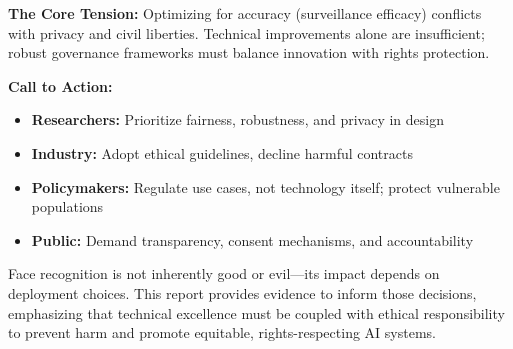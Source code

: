 \documentclass[11pt,a4paper]{article}
\begin{document}
\textbf{The Core Tension:} Optimizing for accuracy (surveillance efficacy) conflicts with privacy and civil liberties. Technical improvements alone are insufficient; robust governance frameworks must balance innovation with rights protection.

\textbf{Call to Action:}
\begin{itemize}
    \item \textbf{Researchers:} Prioritize fairness, robustness, and privacy in design
    \item \textbf{Industry:} Adopt ethical guidelines, decline harmful contracts
    \item \textbf{Policymakers:} Regulate use cases, not technology itself; protect vulnerable populations
    \item \textbf{Public:} Demand transparency, consent mechanisms, and accountability
\end{itemize}

Face recognition is not inherently good or evil—its impact depends on deployment choices. This report provides evidence to inform those decisions, emphasizing that technical excellence must be coupled with ethical responsibility to prevent harm and promote equitable, rights-respecting AI systems.



\end{document}
